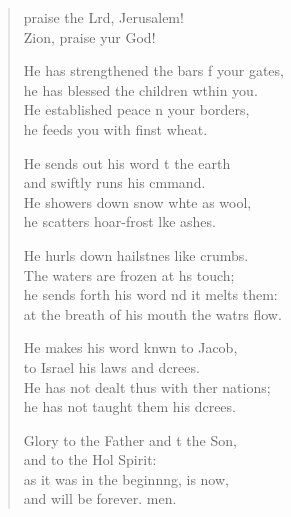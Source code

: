 \settowidth{\versewidth}{He has not dealt thus with other nations.}
\begin{verse}%
  \begin{patverse}
     praise the Lrd, Jerusalem!\Med\\
    Zion, praise yur God!
    
    He has strengthened the bars f your gates,\Med\\
    he has blessed the children w\pointup{\i}thin you.\\
    He established peace n your borders,\Med\\
    he feeds you with finst wheat.
    
    He sends out his word t the earth\Med\\
    and swiftly runs his cmmand.\\
    He showers down snow wh\pointup{\i}te as wool,\Med\\
    he scatters hoar-frost l\pointup{\i}ke ashes.
    
    He hurls down hailstnes like crumbs.\Med\\
    The waters are frozen at h\pointup{\i}s touch;\\
    he sends forth his word nd it melts them:\Med\\
    at the breath of his mouth the watrs flow.
    
    He makes his word knwn to Jacob,\Med\\
    to Israel his laws and dcrees.\\
    He has not dealt thus with ther nations;\Med\\
    he has not taught them his dcrees.
    
    Glory to the Father and t the Son,\Med\\
    and to the Hol Spirit:\\
    as it was in the beginn\pointup{\i}ng, is now,\Med\\
    and will be forever. men.
  \end{patverse}
\end{verse}
